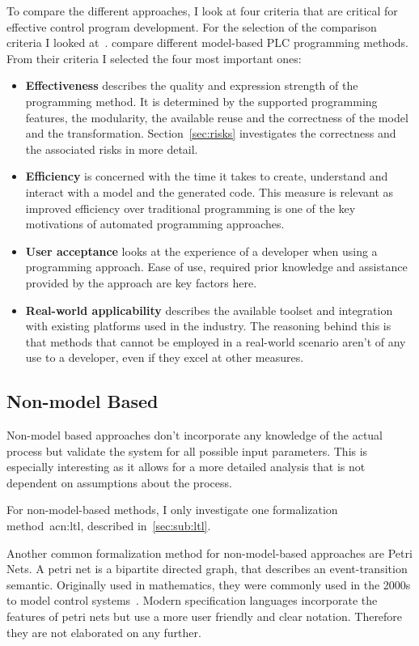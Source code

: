 To compare the different approaches, I look at four criteria that are critical for effective control program development.
For the selection of the comparison criteria I looked at~\cite{VH:2014}.
\citeauthor{VH:2014} compare different model-based PLC programming methods.
From their criteria I selected the four most important ones:
\begin{itemize}
	\item \textbf{Effectiveness} describes the quality and expression strength of the programming method.
	It is determined by the supported programming features, the modularity, the available reuse and the correctness of the model and the transformation.
	Section~\ref{sec:risks} investigates the correctness and the associated risks in more detail.
	\item \textbf{Efficiency} is concerned with the time it takes to create, understand and interact with a model and the generated code.
	This measure is relevant as improved efficiency over traditional programming is one of the key motivations of automated programming approaches.
	\item \textbf{User acceptance} looks at the experience of a developer when using a programming approach.
	Ease of use, required prior knowledge and assistance provided by the approach are key factors here.
	\item \textbf{Real-world applicability} describes the available toolset and integration with existing platforms used in the industry.
	The reasoning behind this is that methods that cannot be employed in a real-world scenario aren't of any use to a developer, even if they excel at other measures.
\end{itemize}

\subsection{Non-model Based}
\label{sec:non_model}

Non-model based approaches don't incorporate any knowledge of the actual process but validate the system for all possible input parameters.
This is especially interesting as it allows for a more detailed analysis that is not dependent on assumptions about the process.

For non-model-based methods, I only investigate one formalization method~\acrlong{acn:ltl}, described in~\ref{sec:sub:ltl}.

Another common formalization method for non-model-based approaches are Petri Nets.
A petri net is a bipartite directed graph, that describes an event-transition semantic.
Originally used in mathematics, they were commonly used in the 2000s to model control systems~\cite{Frey:2000:2, Frey:2000aa}.
Modern specification languages incorporate the features of petri nets but use a more user friendly and clear notation.
Therefore they are not elaborated on any further.

